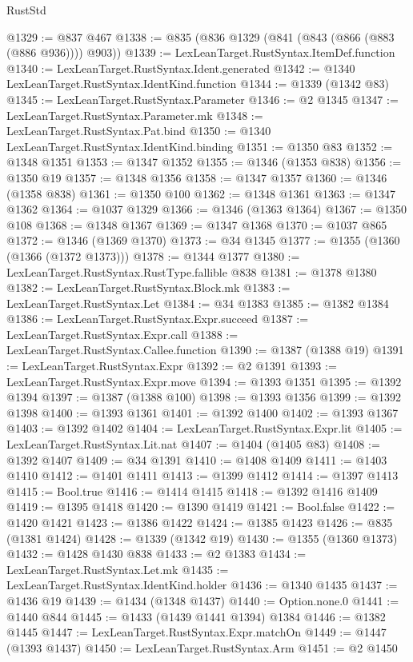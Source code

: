 \begin{lexlean}{RustStd}
\begin{coremodule}
@1329 := @837 @467
@1338 := @835 (@836 @1329 (@841 (@843 (@866 (@883 (@886 @936)))) @903))
@1339 := LexLeanTarget.RustSyntax.ItemDef.function
@1340 := LexLeanTarget.RustSyntax.Ident.generated
@1342 := @1340 LexLeanTarget.RustSyntax.IdentKind.function
@1344 := @1339 (@1342 @83)
@1345 := LexLeanTarget.RustSyntax.Parameter
@1346 := @2 @1345
@1347 := LexLeanTarget.RustSyntax.Parameter.mk
@1348 := LexLeanTarget.RustSyntax.Pat.bind
@1350 := @1340 LexLeanTarget.RustSyntax.IdentKind.binding
@1351 := @1350 @83
@1352 := @1348 @1351
@1353 := @1347 @1352
@1355 := @1346 (@1353 @838)
@1356 := @1350 @19
@1357 := @1348 @1356
@1358 := @1347 @1357
@1360 := @1346 (@1358 @838)
@1361 := @1350 @100
@1362 := @1348 @1361
@1363 := @1347 @1362
@1364 := @1037 @1329
@1366 := @1346 (@1363 @1364)
@1367 := @1350 @108
@1368 := @1348 @1367
@1369 := @1347 @1368
@1370 := @1037 @865
@1372 := @1346 (@1369 @1370)
@1373 := @34 @1345
@1377 := @1355 (@1360 (@1366 (@1372 @1373)))
@1378 := @1344 @1377
@1380 := LexLeanTarget.RustSyntax.RustType.fallible @838
@1381 := @1378 @1380
@1382 := LexLeanTarget.RustSyntax.Block.mk
@1383 := LexLeanTarget.RustSyntax.Let
@1384 := @34 @1383
@1385 := @1382 @1384
@1386 := LexLeanTarget.RustSyntax.Expr.succeed
@1387 := LexLeanTarget.RustSyntax.Expr.call
@1388 := LexLeanTarget.RustSyntax.Callee.function
@1390 := @1387 (@1388 @19)
@1391 := LexLeanTarget.RustSyntax.Expr
@1392 := @2 @1391
@1393 := LexLeanTarget.RustSyntax.Expr.move
@1394 := @1393 @1351
@1395 := @1392 @1394
@1397 := @1387 (@1388 @100)
@1398 := @1393 @1356
@1399 := @1392 @1398
@1400 := @1393 @1361
@1401 := @1392 @1400
@1402 := @1393 @1367
@1403 := @1392 @1402
@1404 := LexLeanTarget.RustSyntax.Expr.lit
@1405 := LexLeanTarget.RustSyntax.Lit.nat
@1407 := @1404 (@1405 @83)
@1408 := @1392 @1407
@1409 := @34 @1391
@1410 := @1408 @1409
@1411 := @1403 @1410
@1412 := @1401 @1411
@1413 := @1399 @1412
@1414 := @1397 @1413
@1415 := Bool.true
@1416 := @1414 @1415
@1418 := @1392 @1416 @1409
@1419 := @1395 @1418
@1420 := @1390 @1419
@1421 := Bool.false
@1422 := @1420 @1421
@1423 := @1386 @1422
@1424 := @1385 @1423
@1426 := @835 (@1381 @1424)
@1428 := @1339 (@1342 @19)
@1430 := @1355 (@1360 @1373)
@1432 := @1428 @1430 @838
@1433 := @2 @1383
@1434 := LexLeanTarget.RustSyntax.Let.mk
@1435 := LexLeanTarget.RustSyntax.IdentKind.holder
@1436 := @1340 @1435
@1437 := @1436 @19
@1439 := @1434 (@1348 @1437)
@1440 := Option.none.{0}
@1441 := @1440 @844
@1445 := @1433 (@1439 @1441 @1394) @1384
@1446 := @1382 @1445
@1447 := LexLeanTarget.RustSyntax.Expr.matchOn
@1449 := @1447 (@1393 @1437)
@1450 := LexLeanTarget.RustSyntax.Arm
@1451 := @2 @1450

\end{coremodule}
\end{lexlean}
